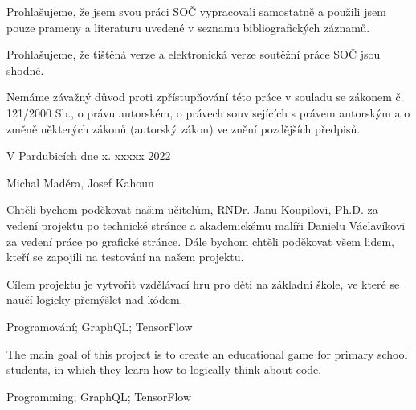 \noindent Prohlašujeme, že jsem svou práci SOČ vypracovali samostatně a použili jsem pouze prameny a literaturu uvedené v seznamu bibliografických záznamů.

\noindent Prohlašujeme, že tištěná verze a elektronická verze soutěžní práce SOČ jsou shodné. 

\noindent Nemáme závažný důvod proti zpřístupňování této práce v souladu se zákonem č. 121/2000 Sb., o právu autorském, o právech souvisejících s právem autorským a o změně některých zákonů (autorský zákon) ve znění pozdějších předpisů. 

\vspace{24 pt}

\noindent V Pardubicích dne x. xxxxx 2022 \dotfill{} 

\hspace{6cm} Michal Maděra, Josef Kahoun

\cleardoublepage

\vspace*{0.8\textheight}

\noindent
Chtěli bychom poděkovat našim učitelům, RNDr. Janu Koupilovi, Ph.D. za vedení projektu po technické stránce a akademickému malíři Danielu Václavíkovi za vedení práce po grafické stránce. Dále bychom chtěli poděkovat všem lidem, kteří se zapojili na testování na našem projektu.

\cleardoublepage


\noindent Cílem projektu je vytvořit vzdělávací hru pro děti na základní škole, ve které se naučí logicky přemýšlet nad kódem.

\vspace{18pt}


\noindent Programování; GraphQL; TensorFlow 

\vspace{18pt}


\noindent The main goal of this project is to create an educational game for primary school students, in which they learn how to logically think about code.

\vspace{18pt}


\noindent Programming; GraphQL; TensorFlow

\cleardoublepage

\tableofcontents